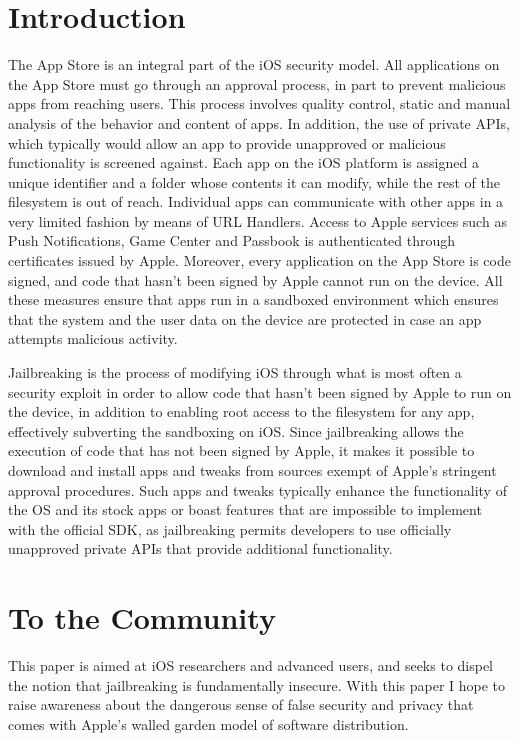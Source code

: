 \documentclass[12pt, titlepage, oneside]{article}
\newcommand{\tab}{\hspace*{2em}}
\begin{document}
\section{Introduction}
\tab The App Store is an integral part of the iOS security model. All applications on the App Store must go through an approval process, in part to prevent malicious apps from reaching users. This process involves quality control, static and manual analysis of the behavior and content of apps. In addition, the use of private APIs, which typically would allow an app to provide unapproved or malicious functionality is screened against. Each app on the iOS platform is assigned a unique identifier and a folder whose contents it can modify, while the rest of the filesystem is out of reach. Individual apps can communicate with other apps in a very limited fashion by means of URL Handlers. Access to Apple services such as Push Notifications, Game Center and Passbook is authenticated through certificates issued by Apple. Moreover, every application on the App Store is code signed, and code that hasn't been signed by Apple cannot run on the device. All these measures ensure that apps run in a sandboxed environment which ensures that the system and the user data on the device are protected in case an app attempts malicious activity.

Jailbreaking is the process of modifying iOS through what is most often a security exploit in order to allow code that hasn't been signed by Apple to run on the device, in addition to enabling root access to the filesystem for any app, effectively subverting the sandboxing on iOS. Since jailbreaking allows the execution of code that has not been signed by Apple, it makes it possible to download and install apps and tweaks from sources exempt of Apple's stringent approval procedures. Such apps and tweaks typically enhance the functionality of the OS and its stock apps or boast features that are impossible to implement with the official SDK, as jailbreaking permits developers to use officially unapproved private APIs that provide additional functionality.

\section{To the Community}
This paper is aimed at iOS researchers and advanced users, and seeks to dispel the notion that jailbreaking is fundamentally insecure. With this paper I hope to raise awareness about the dangerous sense of false security and privacy that comes with Apple's walled garden model of software distribution. 
\end{document}
